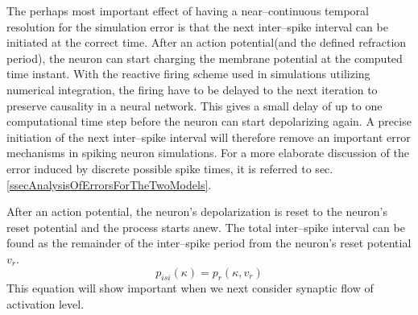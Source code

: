 

	The perhaps most important effect of having a near--continuous temporal resolution for the simulation error is that the next inter--spike interval can be initiated at the correct time. %
	After an action potential(and the defined refraction period), the neuron can start charging the membrane potential at the computed time instant. %
	With the reactive firing scheme used in simulations utilizing numerical integration, the firing have to be delayed to the next iteration to preserve causality in a neural network. %
	This gives a small delay of up to one computational time step before the neuron can start depolarizing again.
	A precise initiation of the next inter--spike interval will therefore remove an important error mechanisms in spiking neuron simulations.
	For a more elaborate discussion of the error induced by discrete possible spike times, it is referred to sec. \ref{ssecAnalysisOfErrorsForTheTwoModels}.

	After an action potential, the neuron's depolarization is reset to the neuron's reset potential and the process starts anew.
	The total inter--spike interval can be found as the remainder of the inter--spike period from the neuron's reset potential $v_r$.
\begin{equation}
	p_{isi}(\kappa) = p_r(\kappa, v_r)%
	\label{eqEstimateOfInterSpikePeriod}
\end{equation}
	This equation will show important when we next consider synaptic flow of activation level.
	
